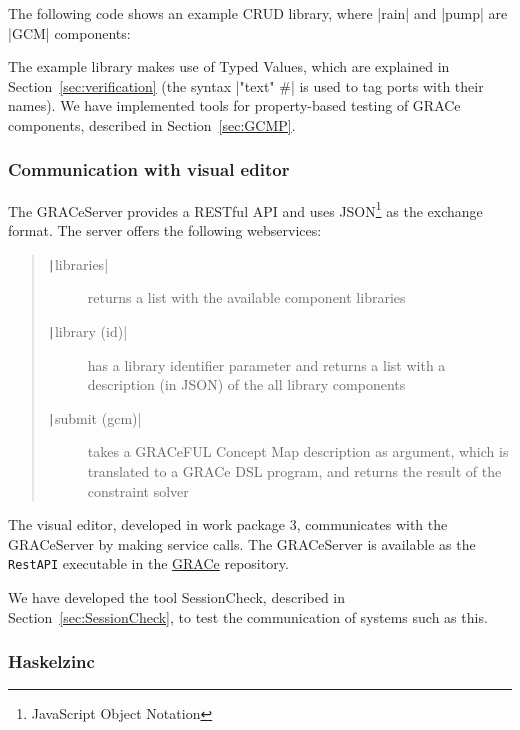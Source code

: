 \documentclass{article}
\newcommand{\haskell}[1]{\texttt|#1|}
\begin{document}
The following code shows an example CRUD library, where |rain| and |pump| are
|GCM| components:
The example library makes use of Typed Values, which are explained in
Section~\ref{sec:verification} (the syntax |"text" #| is used to tag
ports with their names).
%
We have implemented tools for property-based testing of GRACe components,
described in Section~\ref{sec:GCMP}.

\subsubsection*{Communication with visual editor}

The GRACeServer provides a RESTful API and uses JSON\footnote{JavaScript Object
Notation} as the exchange format. The server offers the following webservices:
\begin{quote}
\begin{description}
\item [\haskell{libraries}] returns a list with the available component libraries
\item [\haskell{library (id)}] has a library identifier parameter and returns
  a list with a description (in JSON) of the all library components
\item [\haskell{submit (gcm)}] takes a GRACeFUL Concept Map description as
  argument, which is translated to a GRACe DSL program, and returns the result
  of the constraint solver
\end{description}
\end{quote}
The visual editor, developed in work package 3, communicates with the GRACeServer
by making service calls. The GRACeServer is available as the \texttt{RestAPI}
executable in the \href{https://github.com/GRACeFUL-project/GRACe}{GRACe}
repository.

We have developed the tool SessionCheck, described in
Section~\ref{sec:SessionCheck}, to test the communication of systems such as this.

\subsubsection*{Haskelzinc}
\end{document}
